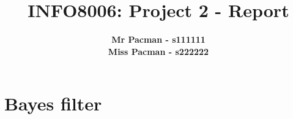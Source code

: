 \documentclass{article}
\begin{document}

\title{\Large{INFO8006: Project 2 - Report}}
\vspace{1cm}
\author{\small{\bf Mr Pacman - s111111} \\ \small{\bf Miss Pacman - s222222}}

\maketitle


\section{Bayes filter}
\end{document}
